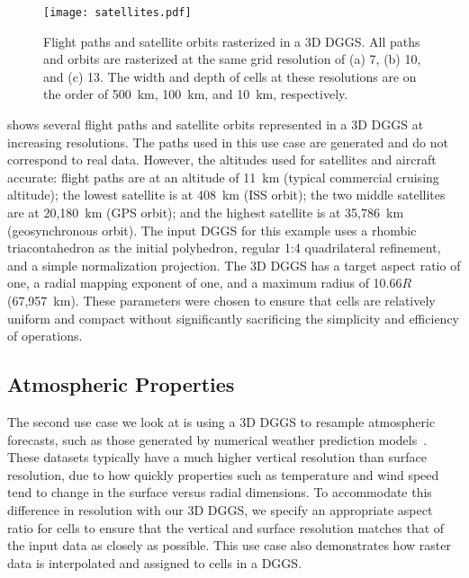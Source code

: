 \begin{figure}[ht!]
	\centering
	\texttt{[image: satellites.pdf]}
	\caption[Flight path and satellite orbit use case showing several sample trajectories]{
		Flight paths and satellite orbits rasterized in a 3D DGGS.
		All paths and orbits are rasterized at the same grid resolution of (a) 7, (b) 10, and (c) 13.
		The width and depth of cells at these resolutions are on the order of 500~km, 100~km, and 10~km, respectively.
	}
	\label{fig:satellites}
\end{figure}


 shows several flight paths and satellite orbits represented in a 3D DGGS at increasing resolutions.
The paths used in this use case are generated and do not correspond to real data.
However, the altitudes used for satellites and aircraft  accurate:
flight paths are at an altitude of 11~km (typical commercial cruising altitude); the lowest satellite is at 408~km (ISS orbit); the two middle satellites are at 20,180~km (GPS orbit); and the highest satellite is at 35,786~km (geosynchronous orbit).
The input DGGS for this example uses a rhombic triacontahedron as the initial polyhedron, regular 1:4 quadrilateral refinement, and a simple normalization projection.
The 3D DGGS has a target aspect ratio of one, a radial mapping exponent of one, and a maximum radius of 10.66$R$ (67,957~km).
These parameters were chosen to ensure that cells are relatively uniform and compact without significantly sacrificing the simplicity and efficiency of operations.


\subsection{Atmospheric Properties} \label{chap:8:atmo}
The second use case we look at is using a 3D DGGS to resample atmospheric forecasts, such as those generated by numerical weather prediction models~\cite{ncepncar, era5}.
These datasets typically have a much higher vertical resolution than surface resolution, due to how quickly properties such as temperature and wind speed tend to change in the surface versus radial dimensions.
To accommodate this difference in resolution with our 3D DGGS, we specify an appropriate aspect ratio for cells to ensure that the vertical and surface resolution matches that of the input data as closely as possible.
This use case also demonstrates how raster data is interpolated and assigned to cells in a DGGS. 


